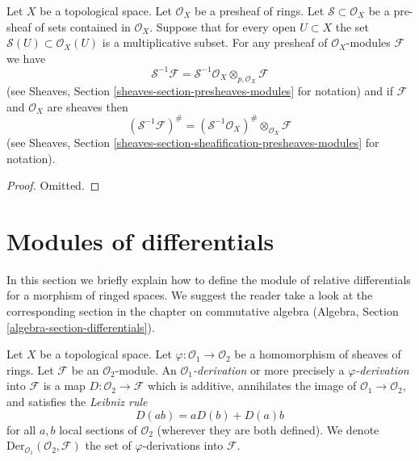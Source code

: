\begin{lemma}
\label{lemma-simple-invert-module}
Let $X$ be a topological space.
Let $\mathcal{O}_X$ be a presheaf of rings.
Let $\mathcal{S} \subset \mathcal{O}_X$ be a pre-sheaf of sets contained
in $\mathcal{O}_X$. Suppose that for every open $U \subset X$ the set
$\mathcal{S}(U) \subset \mathcal{O}_X(U)$ is a multiplicative subset.
For any presheaf of $\mathcal{O}_X$-modules $\mathcal{F}$ we
have
$$
\mathcal{S}^{-1}\mathcal{F}
=
\mathcal{S}^{-1}\mathcal{O}_X \otimes_{p, \mathcal{O}_X} \mathcal{F}
$$
(see Sheaves, Section \ref{sheaves-section-presheaves-modules} for notation)
and if $\mathcal{F}$ and $\mathcal{O}_X$ are sheaves then
$$
(\mathcal{S}^{-1}\mathcal{F})^\#
=
(\mathcal{S}^{-1}\mathcal{O}_X)^\# \otimes_{\mathcal{O}_X} \mathcal{F}
$$
(see Sheaves, Section \ref{sheaves-section-sheafification-presheaves-modules}
for notation).
\end{lemma}

\begin{proof}
Omitted.
\end{proof}








\section{Modules of differentials}
\label{section-differentials}

\noindent
In this section we briefly explain how to define the module of relative
differentials for a morphism of ringed spaces. We suggest the reader take
a look at the corresponding section in the chapter on commutative algebra
(Algebra, Section \ref{algebra-section-differentials}).

\begin{definition}
\label{definition-derivation}
Let $X$ be a topological space. Let $\varphi : \mathcal{O}_1 \to \mathcal{O}_2$
be a homomorphism of sheaves of rings. Let $\mathcal{F}$ be an
$\mathcal{O}_2$-module. An {\it $\mathcal{O}_1$-derivation} or more precisely
a {\it $\varphi$-derivation} into $\mathcal{F}$ is a map
$D : \mathcal{O}_2 \to \mathcal{F}$ which is additive, annihilates the image
of $\mathcal{O}_1 \to \mathcal{O}_2$, and satisfies the
{\it Leibniz rule}
$$
D(ab) = aD(b) + D(a)b
$$
for all $a, b$ local sections of $\mathcal{O}_2$ (wherever they are both
defined). We denote $\text{Der}_{\mathcal{O}_1}(\mathcal{O}_2, \mathcal{F})$
the set of $\varphi$-derivations into $\mathcal{F}$.
\end{definition}

